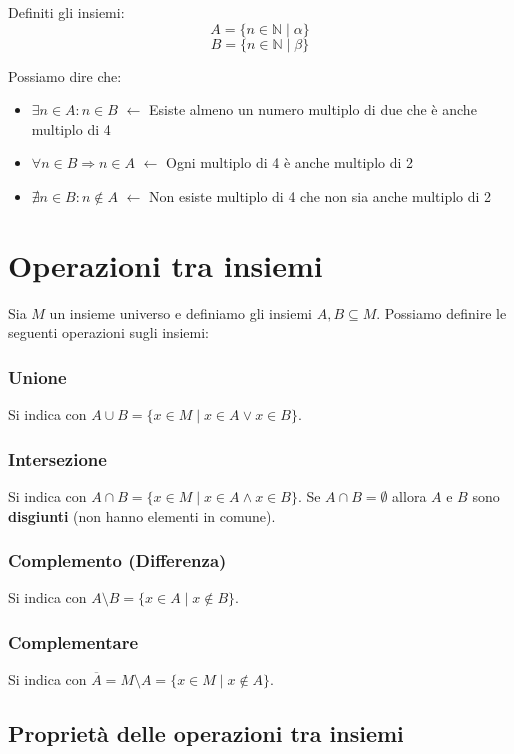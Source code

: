 \documentclass[oneside,10pt]{book} %
\newcommand{\N}{\mathbb{N}}
\begin{document}
Definiti gli insiemi:
\[
A = \{n \in \N \mid \alpha\}
\]
\[
B = \{n \in \N \mid \beta\}
\]

Possiamo dire che:
\begin{itemize}
    \item $\exists n \in A : n \in B$ $\leftarrow$ Esiste almeno un numero multiplo di due che è anche multiplo di 4
    \item $\forall n \in B \Rightarrow n \in A$ $\leftarrow$ Ogni multiplo di 4 è anche multiplo di 2
    \item $\nexists n \in B : n \notin A$ $\leftarrow$ Non esiste multiplo di 4 che non sia anche multiplo di 2
\end{itemize}

\section{Operazioni tra insiemi}
Sia $M$ un insieme universo e definiamo gli insiemi $A, B \subseteq M$. Possiamo definire le seguenti operazioni sugli insiemi:

\subsubsection{Unione}
Si indica con $A \cup B = \{x \in M \mid x \in A \lor x \in B\}$.

\subsubsection{Intersezione}
Si indica con $A \cap B = \{x \in M \mid x \in A \land x \in B\}$. Se $A \cap B = \emptyset$ allora $A$ e $B$ sono \textbf{disgiunti} (non hanno elementi in comune).

\subsubsection{Complemento (Differenza)}
Si indica con $A \setminus B = \{x \in A \mid x \notin B\}$.

\subsubsection{Complementare}
Si indica con $\overline{A} = M \setminus A = \{x \in M \mid x \notin A\}$.

\subsection{Proprietà delle operazioni tra insiemi}
\end{document}

